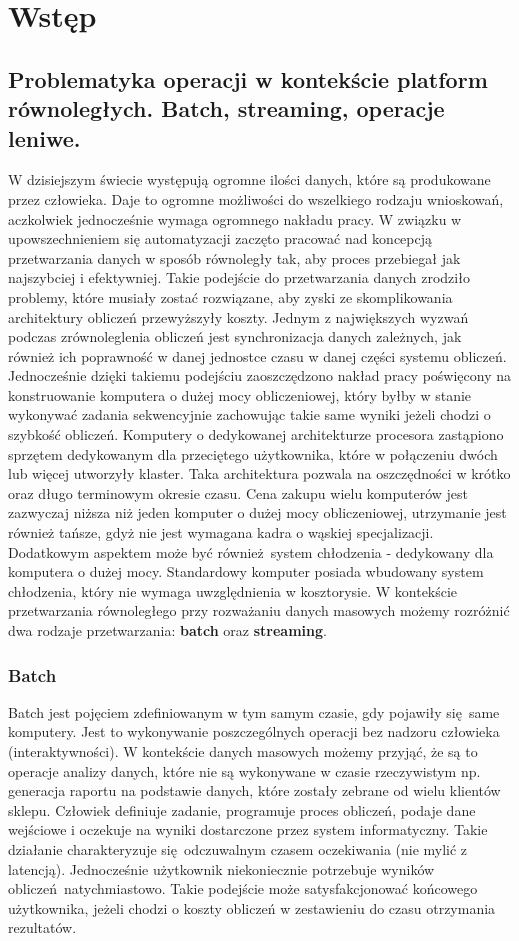 \chapter{Wstęp} \label{chap.introduction}

\section{Problematyka operacji w kontekście platform równoległych. Batch, streaming, operacje leniwe.}
W dzisiejszym świecie występują ogromne ilości danych, które są produkowane przez człowieka. Daje to ogromne możliwości do wszelkiego rodzaju wnioskowań, aczkolwiek jednocześnie wymaga ogromnego nakładu pracy. W związku w upowszechnieniem się automatyzacji zaczęto pracować nad koncepcją przetwarzania danych w sposób równoległy tak, aby proces przebiegał jak najszybciej i efektywniej. Takie podejście do przetwarzania danych zrodziło problemy, które musiały zostać rozwiązane, aby zyski ze skomplikowania architektury obliczeń przewyższyły koszty. Jednym z największych wyzwań podczas zrównoleglenia obliczeń jest synchronizacja danych zależnych, jak również ich poprawność w danej jednostce czasu w danej części systemu obliczeń. Jednocześnie dzięki takiemu podejściu zaoszczędzono nakład pracy poświęcony na konstruowanie komputera o dużej mocy obliczeniowej, który byłby w stanie wykonywać zadania sekwencyjnie zachowując takie same wyniki jeżeli chodzi o szybkość obliczeń. Komputery o dedykowanej architekturze procesora zastąpiono sprzętem dedykowanym dla przeciętego użytkownika, które w połączeniu dwóch lub więcej utworzyły klaster. Taka architektura pozwala na oszczędności w krótko oraz długo terminowym okresie czasu. Cena zakupu wielu komputerów jest zazwyczaj niższa niż jeden komputer o dużej mocy obliczeniowej, utrzymanie jest również tańsze, gdyż nie jest wymagana kadra o wąskiej specjalizacji. Dodatkowym aspektem może być również system chłodzenia - dedykowany dla komputera o dużej mocy. Standardowy komputer posiada wbudowany system chłodzenia, który nie wymaga uwzględnienia w kosztorysie. W kontekście przetwarzania równoległego przy rozważaniu danych masowych możemy rozróżnić dwa rodzaje przetwarzania: \textbf{batch} oraz \textbf{streaming}.
\subsection{Batch}\label{batch_subsection}
Batch jest pojęciem zdefiniowanym w tym samym czasie, gdy pojawiły się same komputery. Jest to wykonywanie poszczególnych operacji bez nadzoru człowieka (interaktywności). W kontekście danych masowych możemy przyjąć, że są to operacje analizy danych, które nie są wykonywane w czasie rzeczywistym np. generacja raportu na podstawie danych, które zostały zebrane od wielu klientów sklepu. Człowiek definiuje zadanie, programuje proces obliczeń, podaje dane wejściowe i oczekuje na wyniki dostarczone przez system informatyczny. Takie działanie charakteryzuje się odczuwalnym czasem oczekiwania (nie mylić z latencją). Jednocześnie użytkownik niekoniecznie potrzebuje wyników obliczeń natychmiastowo. Takie podejście może satysfakcjonować końcowego użytkownika, jeżeli chodzi o koszty obliczeń w zestawieniu do czasu otrzymania rezultatów.
